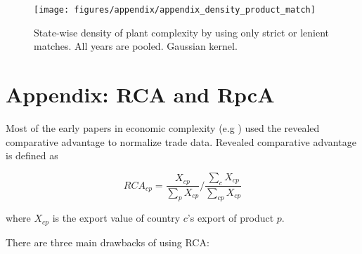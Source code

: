 \documentclass[11pt]{article}
\begin{document}
\begin{appendices}
\begin{figure}[htpb]
	\centering
	\texttt{[image: figures/appendix/appendix\_density\_product\_match]}
	\caption{State-wise density of plant complexity by using only strict or lenient matches. All years are pooled. Gaussian kernel.}%
	\label{fig:density_product_match}
\end{figure}










\newpage 

\section{Appendix: RCA and RpcA}%
\label{sec:rca}
Most of the early papers in economic complexity (e.g \citealp{tacchella_new_2012,hidalgo_building_2009}) used the revealed comparative advantage \citep{balassa_trade_1965} to normalize trade data. Revealed comparative advantage is defined as

\[
	RCA_{cp} = \frac{X_{cp}}{\sum_p X_{cp}} \bigg / \frac{\sum_c X_{cp}}{\sum_{cp} X_{cp}}
\]

where $X_{cp}$ is the export value of country $c$'s export of product $p$.

There are three main drawbacks of using RCA:


\end{appendices}
\end{document}
